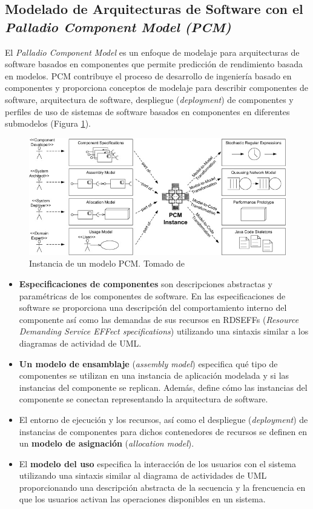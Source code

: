 \documentclass[11pt, twoside]{report}
\begin{document}
\subsection{Modelado de Arquitecturas de Software con el \emph{Palladio Component Model (PCM)}}
El \emph{Palladio Component Model} es un enfoque de modelaje para arquitecturas de software basados en componentes que permite predicción de rendimiento basada en modelos. PCM contribuye el proceso de desarrollo de ingeniería basado en componentes y proporciona conceptos de modelaje para describir componentes de software, arquitectura de software, despliegue (\emph{deployment}) de componentes y perfiles de uso de sistemas de software basados en componentes en diferentes submodelos (Figura \ref{fig:pcm-instance}). 

\begin{figure}[h]
  \centering
  \includegraphics[width=15cm]{palladio-cbse-process}
  \caption{\small{Instancia de un modelo PCM. Tomado de \cite{happe-et-al}}}
  \label{fig:pcm-instance}
\end{figure}

\begin{itemize}
    \item \textbf{Especificaciones de componentes} son descripciones abstractas y paramétricas de los componentes de software. En las especificaciones de software se proporciona una descripción del comportamiento interno del componente así como las demandas de sus recursos en RDSEFFs (\emph{Resource Demanding Service EFFect specifications}) utilizando una sintaxis similar a los diagramas de actividad de UML.
    \item \textbf{Un modelo de ensamblaje} (\emph{assembly model}) especifica qué tipo de componentes se utilizan en una instancia de aplicación modelada y si las instancias del componente se replican. Además, define cómo las instancias del componente se conectan representando la arquitectura de software.
    \item El entorno de ejecución y los recursos, así como el despliegue (\emph{deployment}) de instancias de componentes para dichos contenedores de recursos se definen en un \textbf{modelo de asignación} (\emph{allocation model}).
    \item El \textbf{modelo del uso} especifica la interacción de los usuarios con el sistema utilizando una sintaxis similar al diagrama de actividades de UML proporcionando una descripción abstracta de la secuencia y la frencuencia en que los usuarios activan las operaciones disponibles en un sistema.
\end{itemize}
\end{document}
